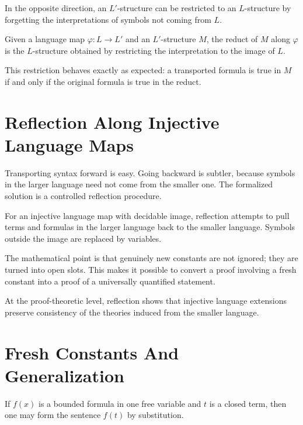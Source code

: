 In the opposite direction, an $L'$-structure can be restricted to an
$L$-structure by forgetting the interpretations of symbols not coming from $L$.

\begin{definition}[Reduct]
\label{def:language-reduct}
Given a language map $\varphi : L \to L'$ and an $L'$-structure $M$, the
reduct of $M$ along $\varphi$ is the $L$-structure obtained by restricting the
interpretation to the image of $L$.
\end{definition}

This restriction behaves exactly as expected: a transported formula is true in
$M$ if and only if the original formula is true in the reduct.

\section{Reflection Along Injective Language Maps}

Transporting syntax forward is easy. Going backward is subtler, because symbols
in the larger language need not come from the smaller one. The formalized
solution is a controlled reflection procedure.

\begin{definition}[Reflection]
\label{def:language-reflection}
For an injective language map with decidable image, reflection attempts to pull
terms and formulas in the larger language back to the smaller language. Symbols
outside the image are replaced by variables.
\end{definition}

The mathematical point is that genuinely new constants are not ignored; they
are turned into open slots. This makes it possible to convert a proof involving
a fresh constant into a proof of a universally quantified statement.

At the proof-theoretic level, reflection shows that injective language
extensions preserve consistency of the theories induced from the smaller
language.

\section{Fresh Constants And Generalization}

\begin{definition}
\label{def:bounded-subst-sentence}
If $f(x)$ is a bounded formula in one free variable and $t$ is a closed term,
then one may form the sentence $f(t)$ by substitution.
\end{definition}

